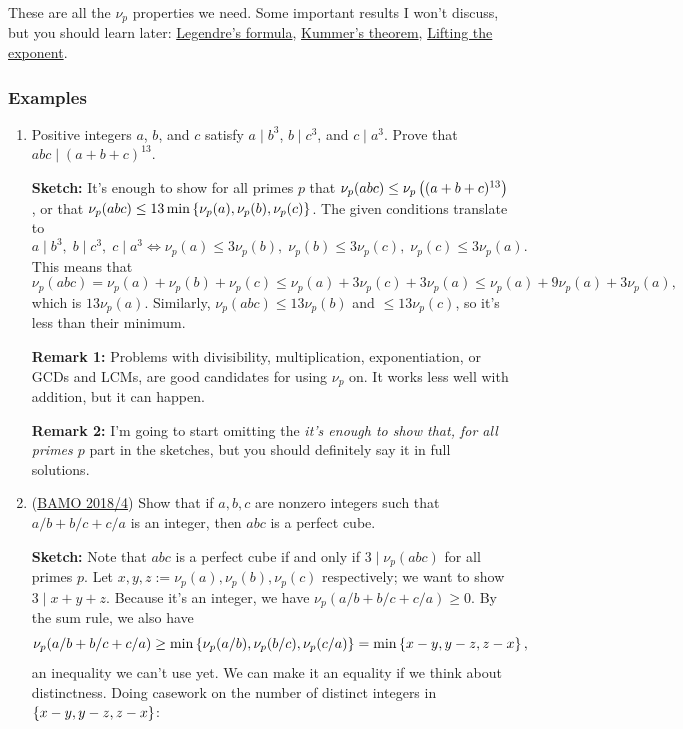 \documentclass[11pt,paper=letter]{scrartcl}
\begin{document}
\noindent
These are all the $\nu_p$ properties we need. Some important results I won't discuss, but you should learn later: \href{https://en.wikipedia.org/wiki/Legendre's_formula}{Legendre's formula}, \href{https://en.wikipedia.org/wiki/Kummer's_theorem}{Kummer's theorem}, \href{https://cjquines.com/files/liftingtheexponent.pdf}{Lifting the exponent}.

\subsubsection*{Examples}

\begin{enumerate}

\item Positive integers $a$, $b$, and $c$ satisfy $a \mid b^3$, $b \mid c^3$, and $c \mid a^3$. Prove that $abc \mid (a + b + c)^{13}$.

\textbf{Sketch:} It's enough to show for all primes $p$ that $\nu_p(abc) \le \nu_p\left( (a + b + c)^{13} \right)$, or that $\nu_p(abc) \le 13 \min\left\{ \nu_p(a), \nu_p(b), \nu_p(c) \right\}$. The given conditions translate to \[
  a \mid b^3,\;b \mid c^3,\;c \mid a^3 \iff \nu_p(a) \le 3 \nu_p(b),\;\nu_p(b) \le 3\nu_p(c),\;\nu_p(c) \le 3\nu_p(a).
\]
This means that \[
  \nu_p(abc) = \nu_p(a) + \nu_p(b) + \nu_p(c) \le \nu_p(a) + 3\nu_p(c) + 3\nu_p(a) \le \nu_p(a) + 9\nu_p(a) + 3\nu_p(a),
\]
which is $13\nu_p(a)$. Similarly, $\nu_p(abc) \le 13\nu_p(b)$ and $\le 13\nu_p(c)$, so it's less than their minimum.

\textbf{Remark 1:} Problems with divisibility, multiplication, exponentiation, or GCDs and LCMs, are good candidates for using $\nu_p$ on. It works less well with addition, but it can happen.

\textbf{Remark 2:} I'm going to start omitting the \textit{it's enough to show that, for all primes $p$} part in the sketches, but you should definitely say it in full solutions.

\item (\href{https://artofproblemsolving.com/community/c291h1904123p13026024}{BAMO 2018/4}) Show that if $a, b, c$ are nonzero integers such that $a/b + b/c + c/a$ is an integer, then $abc$ is a perfect cube.

\textbf{Sketch:} Note that $abc$ is a perfect cube if and only if $3 \mid \nu_p(abc)$ for all primes $p$. Let $x, y, z := \nu_p(a), \nu_p(b), \nu_p(c)$ respectively; we want to show $3 \mid x + y + z$. Because it's an integer, we have $\nu_p(a/b + b/c + c/a) \ge 0$. By the sum rule, we also have \[
  \nu_p(a/b + b/c + c/a) \ge \min\left\{  \nu_p(a/b), \nu_p(b/c), \nu_p(c/a)  \right\} = \min\left\{ x-y, y-z, z-x \right\},
\]
an inequality we can't use yet. We can make it an equality if we think about distinctness. Doing casework on the number of distinct integers in $\left\{ x-y, y-z, z-x \right\}$:


\end{enumerate}
\end{document}
